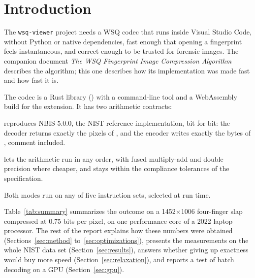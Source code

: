 \section{Introduction}
\label{sec:introduction}

The \texttt{wsq-viewer} project needs a WSQ codec that runs inside Visual Studio Code, without
Python or native dependencies, fast enough that opening a fingerprint feels instantaneous, and
correct enough to be trusted for forensic images. The companion document \emph{The WSQ
Fingerprint Image Compression Algorithm} describes the algorithm; this one describes how its
implementation was made fast and how fast it is.

The codec is a Rust library () with a command-line tool and a WebAssembly
build for the extension. It has two arithmetic contracts:
\begin{description}[leftmargin=0pt]
  \item[Exact mode] reproduces NBIS 5.0.0, the NIST reference implementation, bit for bit: the
    decoder returns exactly the pixels of , and the encoder writes exactly the bytes of
    , comment included.
  \item[Fast mode] lets the arithmetic run in any order, with fused multiply-add and double
    precision where cheaper, and stays within the compliance tolerances of the specification.
\end{description}
Both modes run on any of five instruction sets, selected at run time.

Table~\ref{tab:summary} summarizes the outcome on a 1452$\times$1006 four-finger slap
compressed at 0.75 bits per pixel, on one performance core of a 2022 laptop processor. The rest
of the report explains how these numbers were obtained (Sections~\ref{sec:method}
to~\ref{sec:optimizations}), presents the measurements on the whole NIST data set
(Section~\ref{sec:results}), answers whether giving up exactness would buy more speed
(Section~\ref{sec:relaxation}), and reports a test of batch decoding on a GPU
(Section~\ref{sec:gpu}).


